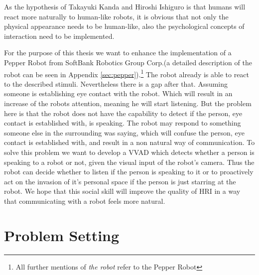 As the hypothesis of Takayuki Kanda and Hiroshi Ishiguro is that humans will react more naturally to human-like robots, it is obvious that not only the physical appearance needs to be human-like, also the psychological concepts of interaction need to be implemented.

For the purpose of this thesis we want to enhance the implementation of a Pepper Robot from SoftBank Robotics Group Corp.(a detailed description of the robot can be seen in Appendix \ref{sec:pepper}).\footnote{All further mentions of \emph{the robot} refer to the Pepper Robot}
The robot already is able to react to the described stimuli. Nevertheless there is a gap after that.
Assuming someone is establishing eye contact with the robot.
Which will result in an increase of the robots attention, meaning he will start listening.
But the problem here is that the robot does not have the capability to detect if the person, eye contact is established with, is speaking.
The robot may respond to something someone else in the surrounding was saying, which will confuse the person, eye contact is established with, and result in a non natural way of communication.
To solve this problem we want to develop a VVAD which detects whether a person is speaking to a robot or not, given the visual input of the robot's camera. Thus the robot can decide whether to listen if the person is speaking to it or to proactively act on the invasion of it's personal space if the person is just starring at the robot.
We hope that this social skill will improve the quality of HRI in a way that communicating with a robot feels more natural.




\section{Problem Setting}\label{sec:problem}

